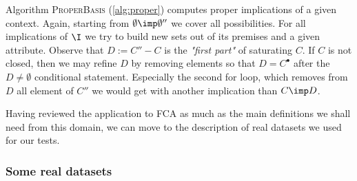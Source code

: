\vspace{1.2em}

Algorithm \textsc{ProperBasis} (\ref{alg:proper}) computes proper implications of a given context. Again, starting from $\emptyset \imp \emptyset''$ we cover all possibilities. For all implications of $\I$ we try to build new sets out of
its premises and a given attribute. Observe that $D := C'' - C$ is the \textit{"first part"} of saturating $C$. If $C$ is not closed, then we may refine $D$ by removing elements so that $D = C^{\bullet}$ after the $D \neq \emptyset$ conditional statement. Especially the second for loop, which removes
from $D$ all element of $C''$ we would get with another implication than $C \imp D$.

\vspace{1.2em}

Having reviewed the application to FCA as much as the main definitions we shall need from this domain, we can move to the description of real datasets we used for our tests.




\subsubsection{Some real datasets}

